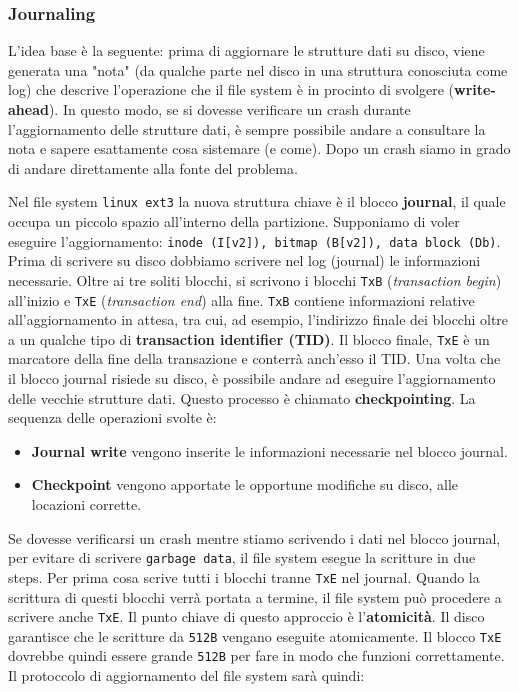 \documentclass[12pt, twoside, letterpaper]{article}
\begin{document}
			\subsubsection{Journaling}
				L'idea base è la seguente: prima di aggiornare le strutture dati su disco, viene generata una "nota" (da qualche parte nel disco in una struttura conosciuta come log) che descrive l'operazione che il file system è in procinto di svolgere (\textbf{write-ahead}). In questo modo, se si dovesse verificare un crash durante l'aggiornamento delle strutture dati, è sempre possibile andare a consultare la nota e sapere esattamente cosa sistemare (e come). Dopo un crash siamo in grado di andare direttamente alla fonte del problema.
				
				Nel file system \texttt{linux ext3} la nuova struttura chiave è il blocco \textbf{journal}, il quale occupa un piccolo spazio all'interno della partizione. Supponiamo di voler eseguire l'aggiornamento: \texttt{inode (I[v2]), bitmap (B[v2]), data block (Db)}. Prima di scrivere su disco dobbiamo scrivere nel log (journal) le informazioni necessarie. Oltre ai tre soliti blocchi, si scrivono i blocchi \texttt{TxB} (\textit{transaction begin}) all'inizio e \texttt{TxE} (\textit{transaction end}) alla fine. \texttt{TxB} contiene informazioni relative all'aggiornamento in attesa, tra cui, ad esempio, l'indirizzo finale dei blocchi oltre a un qualche tipo di \textbf{transaction identifier (TID)}. Il blocco finale, \texttt{TxE} è un marcatore della fine della transazione e conterrà anch'esso il TID. Una volta che il blocco journal risiede su disco, è possibile andare ad eseguire l'aggiornamento delle vecchie strutture dati. Questo processo è chiamato \textbf{checkpointing}. La sequenza delle operazioni svolte è:
				\begin{itemize}
					\item \textbf{Journal write} vengono inserite le informazioni necessarie nel blocco journal.
					\item \textbf{Checkpoint} vengono apportate le opportune modifiche su disco, alle locazioni corrette. 
				\end{itemize}
				Se dovesse verificarsi un crash mentre stiamo scrivendo i dati nel blocco journal, per evitare di scrivere \texttt{garbage data}, il file system esegue la scritture in due steps. Per prima cosa scrive tutti i blocchi tranne \texttt{TxE} nel journal. Quando la scrittura di questi blocchi verrà portata a termine, il file system può procedere a scrivere anche \texttt{TxE}. Il punto chiave di questo approccio è l'\textbf{atomicità}. Il disco garantisce che le scritture da \texttt{512B} vengano eseguite atomicamente. Il blocco \texttt{TxE} dovrebbe quindi essere grande \texttt{512B} per fare in modo che funzioni correttamente. Il protoccolo di aggiornamento del file system sarà quindi:
\end{document}
